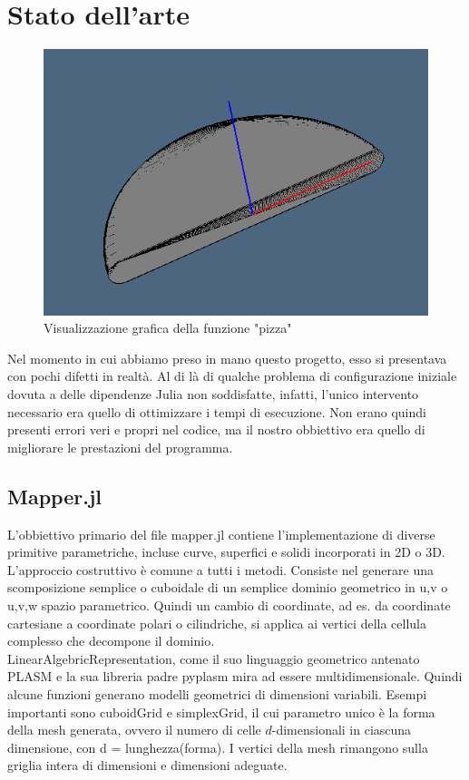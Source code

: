 \documentclass[a4paper]{extreport}
\begin{document}
\chapter{Stato dell'arte}
\begin{figure}[!h]
    \includegraphics[width=\textwidth]{./immagini/mapperJL1.png}
    \caption{Visualizzazione grafica della funzione "pizza"}
\end{figure}
\begin{multicols*}{2}
Nel momento in cui abbiamo preso in mano questo progetto, esso si presentava
con pochi difetti in realtà. Al di là di qualche problema di configurazione
iniziale dovuta a delle dipendenze Julia non soddisfatte, infatti, l'unico 
intervento necessario era quello di ottimizzare i tempi di esecuzione.
Non erano quindi presenti errori veri e propri nel codice, ma il nostro obbiettivo
era quello di migliorare le prestazioni del programma.
\section{Mapper.jl}
L'obbiettivo primario del file mapper.jl contiene l'implementazione di diverse primitive parametriche, incluse curve, superfici e solidi incorporati in 2D o 3D.
L'approccio costruttivo è comune a tutti i metodi. Consiste nel generare una scomposizione semplice o cuboidale di un semplice dominio geometrico in
u,v o u,v,w spazio parametrico. Quindi un cambio di coordinate, ad es. da coordinate cartesiane a coordinate polari o cilindriche, si applica ai vertici della cellula
complesso che decompone il dominio.\\
LinearAlgebricRepresentation, come il suo linguaggio geometrico antenato PLASM e la sua libreria padre pyplasm mira ad essere multidimensionale. Quindi
alcune funzioni generano modelli geometrici di dimensioni variabili. Esempi importanti sono cuboidGrid e simplexGrid, il cui parametro unico è
la forma della mesh generata, ovvero il numero di celle $d$-dimensionali in ciascuna dimensione, con d = lunghezza(forma). I vertici della mesh rimangono
sulla griglia intera di dimensioni e dimensioni adeguate.\end{multicols*}
\end{document}
